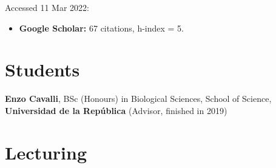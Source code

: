 Accessed 11 Mar 2022:

\begin{itemize}
\item \textbf{Google Scholar:} 67 citations, h-index  = 5.

\end{itemize}

\HRule

\section{Students}

\begin{innerlist}

\item[]{\bf Enzo Cavalli}, BSc (Honours) in Biological Sciences, School of Science, {\bf Universidad de la Rep\'{u}blica} (Advisor, finished in 2019)

\end{innerlist}

\HRule

\section{Lecturing}

